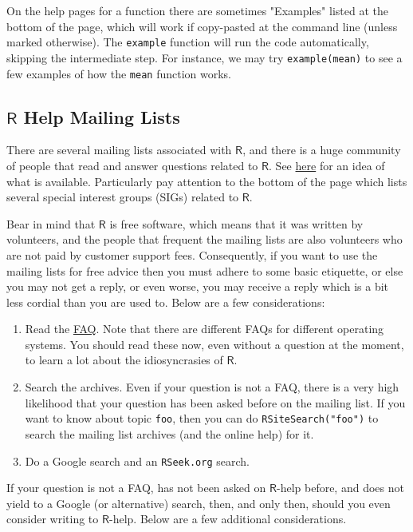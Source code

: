 On the help pages for a function there are sometimes "Examples"
listed at the bottom of the page, which will work if copy-pasted at
the command line (unless marked otherwise). The \texttt{example}
 function will run the code
automatically, skipping the intermediate step. For instance, we may
try \texttt{example(mean)} to see a few examples of how the \texttt{mean} function
works.

\subsection{\(\mathsf{R}\) Help Mailing Lists}
\label{sec-2-4-1}

There are several mailing lists associated with \(\mathsf{R}\), and
there is a huge community of people that read and answer questions
related to \(\mathsf{R}\). See \href{http://www.r-project.org/mail.html}{here} for an idea of what is
available. Particularly pay attention to the bottom of the page which
lists several special interest groups (SIGs) related to
\(\mathsf{R}\).

Bear in mind that \(\mathsf{R}\) is free software, which means that it
was written by volunteers, and the people that frequent the mailing
lists are also volunteers who are not paid by customer support
fees. Consequently, if you want to use the mailing lists for free
advice then you must adhere to some basic etiquette, or else you may
not get a reply, or even worse, you may receive a reply which is a bit
less cordial than you are used to. Below are a few considerations:
\begin{enumerate}
\item Read the \href{http://cran.r-project.org/faqs.html}{FAQ}. Note that there are different FAQs for different
operating systems. You should read these now, even without a
question at the moment, to learn a lot about the idiosyncrasies of
\(\mathsf{R}\).
\item Search the archives. Even if your question is not a FAQ, there is a
very high likelihood that your question has been asked before on
the mailing list. If you want to know about topic \texttt{foo}, then you
can do \texttt{RSiteSearch("foo")}
 to search the
mailing list archives (and the online help) for it.
\item Do a Google search and an \texttt{RSeek.org} search.
\end{enumerate}

If your question is not a FAQ, has not been asked on
\(\mathsf{R}\)-help before, and does not yield to a Google (or
alternative) search, then, and only then, should you even consider
writing to \(\mathsf{R}\)-help. Below are a few additional
considerations.

